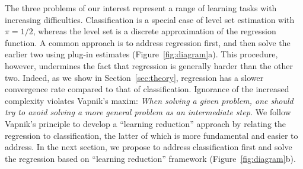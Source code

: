 \documentclass[11pt]{article}
\theoremstyle{definition}
\begin{document}


The three problems of our interest represent a range of learning tasks with increasing difficulties. Classification is a special case of level set estimation with $\pi=1/2$, whereas the level set is a discrete approximation of the regression function. A common approach is to address regression first, and then solve the earlier two using plug-in estimates (Figure~\ref{fig:diagram}a). This procedure, however, undermines the fact that regression is generally harder than the other two. Indeed, as we show in Section~\ref{sec:theory}, regression has a slower convergence rate compared to that of classification. 
Ignorance of the increased complexity violates Vapnik’s maxim: \emph{When solving a given problem, one should try to avoid solving a more general problem as an intermediate step.}  We follow Vapnik's principle to develop a ``learning reduction'' approach by relating the regression to classification, the latter of which is more fundamental and easier to address. In the next section, we propose to address classification first and solve the regression based on ``learning reduction'' framework (Figure~\ref{fig:diagram}b).
\end{document}
